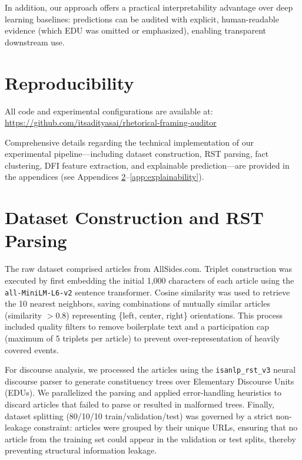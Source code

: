 \documentclass[11pt]{article}
\begin{document}
In addition, our approach offers a practical interpretability advantage over deep learning baselines: predictions can be audited with explicit, human-readable evidence (which EDU was omitted or emphasized), enabling transparent downstream use.

\section{Reproducibility}

All code and experimental configurations are available at: \url{https://github.com/itsadityasai/rhetorical-framing-auditor}

Comprehensive details regarding the technical implementation of our experimental pipeline---including dataset construction, RST parsing, fact clustering, DFI feature extraction, and explainable prediction---are provided in the appendices (see Appendices \ref{app:dataset}--\ref{app:explainability}).




\appendix

\section{Dataset Construction and RST Parsing}
\label{app:dataset}
The raw dataset comprised articles from AllSides.com. Triplet construction was executed by first embedding the initial 1,000 characters of each article using the \texttt{all-MiniLM-L6-v2} sentence transformer. Cosine similarity was used to retrieve the 10 nearest neighbors, saving combinations of mutually similar articles (similarity $> 0.8$) representing \{left, center, right\} orientations. This process included quality filters to remove boilerplate text and a participation cap (maximum of 5 triplets per article) to prevent over-representation of heavily covered events.

For discourse analysis, we processed the articles using the \texttt{isanlp\_rst\_v3} neural discourse parser to generate constituency trees over Elementary Discourse Units (EDUs). We parallelized the parsing and applied error-handling heuristics to discard articles that failed to parse or resulted in malformed trees. Finally, dataset splitting (80/10/10 train/validation/test) was governed by a strict non-leakage constraint: articles were grouped by their unique URLs, ensuring that no article from the training set could appear in the validation or test splits, thereby preventing structural information leakage.
\end{document}

